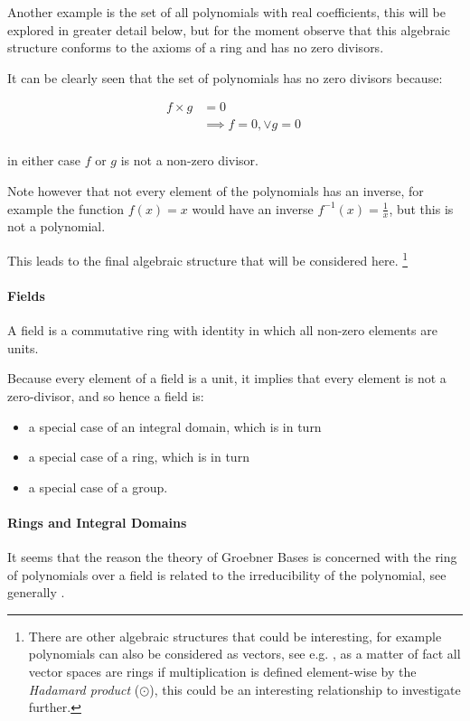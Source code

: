 \documentclass[a4paper,11pt,twoside]{article}
\begin{document}
Another example is the set of all polynomials with real
coefficients, this will be explored in greater detail below, but
for the moment observe that this algebraic structure conforms to
the axioms of a ring and has no zero divisors.

It can be clearly seen that the set of polynomials has no zero
divisors because:

\begin{align}
f \times g &= 0 \\
&\implies f = 0, \lor g = 0 \ \\
\end{align}

in either case \(f\) or \(g\) is not a non-zero divisor.

Note however that not every element of the polynomials has an
inverse, for example the function \(f(x)=x\) would have an inverse
\(f^{-1}(x)=\frac{1}{x}\), but this is not a polynomial.

This leads to the final algebraic structure that will be considered
here. \footnote{There are other algebraic structures that could be interesting,
for example polynomials can also be considered as vectors, see
e.g. \cite{larsonElementaryLinearAlgebra1991a}, as a matter of fact all
vector spaces are rings if multiplication is defined element-wise by
the \emph{Hadamard product} (\(\odot\)), this could be an interesting
relationship to investigate further.}
\paragraph{Fields}
\label{sec:org5f09c06}
A field is a commutative ring with identity in which all non-zero
elements are units.

Because every element of a field is a unit, it
implies that every element is not a zero-divisor, and so hence a
field is:

\begin{itemize}
\item a special case of an integral domain, which is in turn
\item a special case of a ring, which is in turn
\item a special case of a group.
\end{itemize}

\paragraph{Rings and Integral Domains}
\label{sec:org44ae102}
It seems that the reason the theory of Groebner Bases is concerned
with the ring of polynomials over a field is related to the
irreducibility of the polynomial, see generally \cite{EquivalenceDefinitionsIrreducible}.
\end{document}
